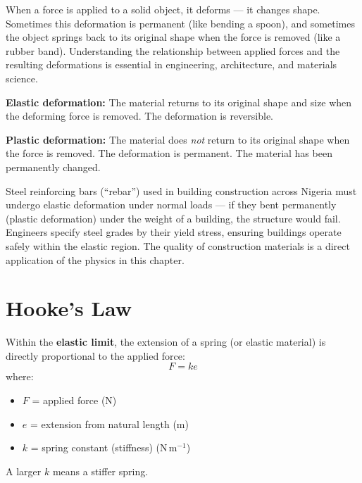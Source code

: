 When a force is applied to a solid object, it deforms
--- it changes shape. Sometimes this deformation is
permanent (like bending a spoon), and sometimes the
object springs back to its original shape when the
force is removed (like a rubber band). Understanding
the relationship between applied forces and the
resulting deformations is essential in engineering,
architecture, and materials science.

\begin{definitionbox}
\textbf{Elastic deformation:} The material returns
to its original shape and size when the deforming
force is removed. The deformation is reversible.

\vspace{0.4cm}

\textbf{Plastic deformation:} The material does
\textit{not} return to its original shape when the
force is removed. The deformation is permanent.
The material has been permanently changed.
\end{definitionbox}

\begin{realworldbox}
Steel reinforcing bars (``rebar'') used in building
construction across Nigeria must undergo elastic
deformation under normal loads --- if they bent
permanently (plastic deformation) under the weight
of a building, the structure would fail. Engineers
specify steel grades by their yield stress, ensuring
buildings operate safely within the elastic region.
The quality of construction materials is a direct
application of the physics in this chapter.
\end{realworldbox}

\section{Hooke's Law}

\begin{lawbox}
Within the \textbf{elastic limit}, the extension
of a spring (or elastic material) is directly
proportional to the applied force:
\[
  F = ke
\]
where:
\begin{itemize}[noitemsep]
  \item $F$ = applied force (N)
  \item $e$ = extension from natural length (m)
  \item $k$ = spring constant (stiffness) (N\,m$^{-1}$)
\end{itemize}
A larger $k$ means a stiffer spring.
\end{lawbox}

